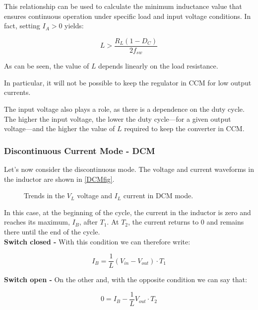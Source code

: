 \documentclass[../main.tex]{subfiles}
\begin{document}
This relationship can be used to calculate the minimum inductance value that ensures continuous operation under specific load and input voltage conditions. In fact, setting $I_A > 0$ yields:

\begin{equation}
	L > \frac{R_L(1 - D_C)}{2f_{sw}}
\end{equation}

As can be seen, the value of $L$ depends linearly on the load resistance.

In particular, it will not be possible to keep the regulator in CCM for low output currents. 

The input voltage also plays a role, as there is a dependence on the duty cycle. The higher the input voltage, the lower the duty cycle—for a given output voltage—and the higher the value of $L$ required to keep the converter in CCM.

\subsubsection*{Discontinuous Current Mode - DCM}


Let’s now consider the discontinuous mode. 
The voltage and current waveforms in the inductor are shown in \autoref{DCMfig}.

\begin{figure}
\begin{center}

\caption{Trends in the $V_L$ voltage and $I_L$ current in DCM mode.}
\label{DCMfig}	
\end{center}	
\end{figure}

In this case, at the beginning of the cycle, the current in the inductor is zero and reaches its maximum, $I_B$, after $T_1$. At $T_2$, the current returns to 0 and remains there until the end of the cycle.\\

\textbf{Switch closed -} With this condition we can therefore write:

\begin{equation}
	I_B = \frac{1}{L}(V_{in} - V_{out}) \cdot T_1
\end{equation}

\textbf{Switch open -} On the other and, with the opposite condition we can say that: 

\begin{equation}
	0 = I_B - \frac{1}{L} V_{out} \cdot T_2
\end{equation}
\end{document}
